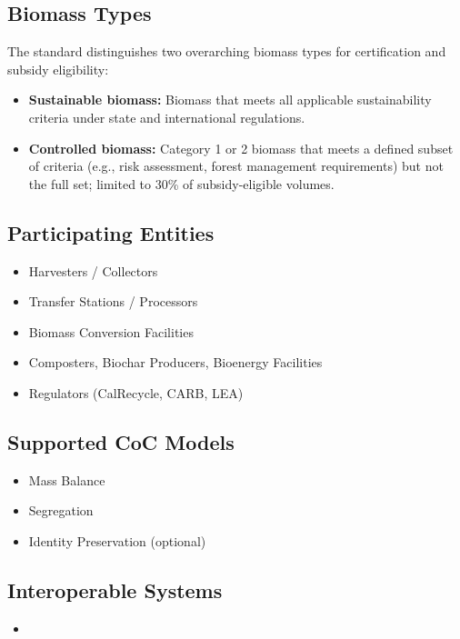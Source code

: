 \documentclass{article}
\begin{document}
\subsection*{Biomass Types}
The standard distinguishes two overarching biomass types for certification and subsidy eligibility:
\begin{itemize}[noitemsep]
    \item \textbf{Sustainable biomass:} Biomass that meets all applicable sustainability criteria under state and international regulations.
    \item \textbf{Controlled biomass:} Category 1 or 2 biomass that meets a defined subset of criteria (e.g., risk assessment, forest management requirements) but not the full set; limited to 30\% of subsidy-eligible volumes.
\end{itemize}

\subsection*{Participating Entities}
\begin{itemize}[noitemsep]
    \item Harvesters / Collectors
    \item Transfer Stations / Processors
    \item Biomass Conversion Facilities
    \item Composters, Biochar Producers, Bioenergy Facilities
    \item Regulators (CalRecycle, CARB, LEA)
\end{itemize}

\subsection*{Supported CoC Models}
\begin{itemize}[noitemsep]
    \item Mass Balance
    \item Segregation
    \item Identity Preservation (optional)
\end{itemize}

\subsection*{Interoperable Systems}
\begin{itemize}[noitemsep]
    \item
\end{itemize}
\end{document}
